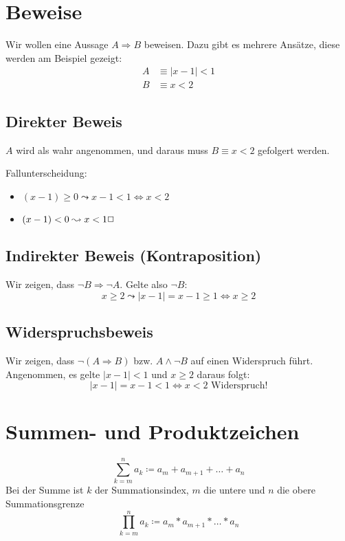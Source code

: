 \section{Beweise}
Wir wollen eine Aussage $A\Rightarrow B$ beweisen. Dazu gibt es mehrere Ansätze, diese werden am Beispiel gezeigt:
\begin{align*}
  A &\equiv |x-1|<1\\
  B &\equiv x<2
\end{align*}
\subsection{Direkter Beweis}
$A$ wird als wahr angenommen, und daraus muss $B\equiv x<2$ gefolgert werden.

Fallunterscheidung:
\begin{itemize}
  \item $(x-1)\geq0\leadsto x-1<1 \Leftrightarrow x<2$
  \item $(x-1)<0\leadsto x<1 \hfill\Box$
\end{itemize}
\subsection{Indirekter Beweis (Kontraposition)}
Wir zeigen, dass $\neg B\Rightarrow \neg A$.
Gelte also $\neg B$:
\begin{equation*}
  x\geq2 \leadsto |x-1|=x-1\geq 1 \Leftrightarrow x\geq 2
\end{equation*}
\subsection{Widerspruchsbeweis}
Wir zeigen, dass $\neg(A\Rightarrow B)$ bzw. $A\wedge \neg B$ auf einen Widerspruch führt.
Angenommen, es gelte $|x-1|<1$ und $x\geq 2$ daraus folgt:
\begin{equation*}
  |x-1|=x-1<1\Leftrightarrow x<2 \text{ Widerspruch!}
\end{equation*}


\section{Summen- und Produktzeichen}
\begin{equation*}
  \sum\limits_{k=m}^n a_k\coloneqq a_m + a_{m+1} + \ldots + a_n
\end{equation*}
Bei der Summe ist $k$ der Summationsindex, $m$ die untere und $n$ die obere Summationsgrenze
\begin{equation*}
  \prod\limits_{k=m}^n a_k\coloneqq a_m * a_{m+1} * \ldots * a_n
\end{equation*}

